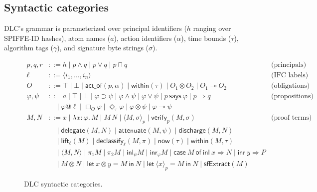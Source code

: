 
\subsection{Syntactic categories}

DLC's grammar is parameterized over principal identifiers ($h$ ranging
over SPIFFE-ID hashes), atom names ($a$), action identifiers ($\alpha$),
time bounds ($\tau$), algorithm tags ($\gamma$), and signature byte
strings ($\sigma$).

\begin{figure}[h]
\small
\begin{align*}
p, q, r &::= h \mid p \wedge q \mid p \vee q \mid p \sqcap q
& \text{(principals)} \\
\ell &::= \langle i_1, \ldots, i_n \rangle
& \text{(IFC labels)} \\
O &::= \top \mid \bot \mid \mathsf{act\_of}(p, \alpha) \mid \mathsf{within}(\tau)
\mid O_1 \otimes O_2 \mid O_1 \multimap O_2
& \text{(obligations)} \\
\varphi, \psi &::= a \mid \top \mid \bot \mid \varphi \supset \psi
\mid \varphi \wedge \psi \mid \varphi \vee \psi
\mid p~\mathsf{says}~\varphi \mid p \Rightarrow q
& \text{(propositions)} \\
&\quad \mid \varphi @ \ell \mid \Box_O \varphi \mid \Diamond_\tau \varphi
\mid \varphi \otimes \psi \mid \varphi \multimap \psi \\
M, N &::= x \mid \lambda x{:}\varphi.\, M \mid M\,N
\mid \langle M, \sigma \rangle_p \mid \mathsf{verify}_p(M, \sigma)
& \text{(proof terms)} \\
&\quad \mid \mathsf{delegate}(M, N) \mid \mathsf{attenuate}(M, \psi)
\mid \mathsf{discharge}(M, N) \\
&\quad \mid \mathsf{lift}_\ell(M) \mid \mathsf{declassify}_\ell(M, \pi)
\mid \mathsf{now}(\tau) \mid \mathsf{within}(M, \tau) \\
&\quad \mid \langle M, N \rangle \mid \pi_1 M \mid \pi_2 M \mid \mathsf{inl}_\psi M
\mid \mathsf{inr}_\varphi M \mid \mathsf{case}~M~\mathsf{of}~\mathsf{inl}~x \Rightarrow N \mid \mathsf{inr}~y \Rightarrow P \\
&\quad \mid M \otimes N \mid \mathsf{let}~x \otimes y = M~\mathsf{in}~N
\mid \mathsf{let}~\langle x \rangle_p = M~\mathsf{in}~N \mid \mathsf{sfExtract}(M)
\end{align*}
\caption{DLC syntactic categories.}
\label{fig:syntax}
\end{figure}

